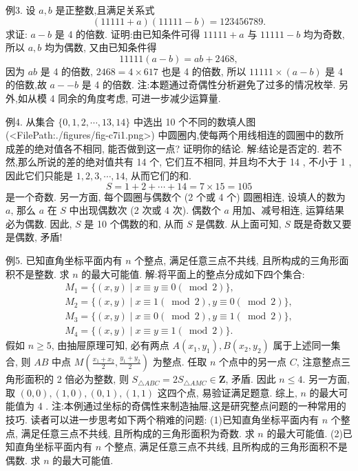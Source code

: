例3. 设 $a, b$ 是正整数,且满足关系式
$$
(11111+a)(11111-b)=123456789 .
$$
求证: $a-b$ 是 4 的倍数.
证明:由已知条件可得 $11111+a$ 与 $11111-b$ 均为奇数,所以 $a, b$ 均为偶数, 又由已知条件得
$$
11111(a-b)=a b+2468,
$$
因为 $a b$ 是 4 的倍数, $2468=4 \times 617$ 也是 4 的倍数, 所以 $11111 \times(a-b)$ 是 4 的倍数,故 $a--b$ 是 4 的倍数.
注:本题通过奇偶性分析避免了过多的情况枚举.
另外,如从模 4 同余的角度考虑, 可进一步减少运算量.



例4. 从集合 $\{0,1,2, \cdots, 13,14\}$ 中选出 10 个不同的数填人图 (<FilePath:./figures/fig-c7i1.png>) 中圆圈内,使每两个用线相连的圆圈中的数所成差的绝对值各不相同, 能否做到这一点? 证明你的结论.
解:结论是否定的.
若不然,那么所说的差的绝对值共有 14 个, 它们互不相同, 并且均不大于 14 , 不小于 1 , 因此它们只能是 $1,2,3, \cdots, 14$, 从而它们的和.
$$
S=1+2+\cdots+14=7 \times 15=105
$$
是一个奇数.
另一方面, 每个圆圈与偶数个 (2 个或 4 个) 圆圈相连, 设填人的数为 $a$, 那么 $a$ 在 $S$ 中出现偶数次 (2 次或 4 次). 偶数个 $a$ 用加、减号相连, 运算结果必为偶数.
因此, $S$ 是 10 个偶数的和, 从而 $S$ 是偶数.
从上面可知, $S$ 既是奇数又要是偶数, 矛盾!



例5. 已知直角坐标平面内有 $n$ 个整点, 满足任意三点不共线, 且所构成的三角形面积不是整数.
求 $n$ 的最大可能值.
解:将平面上的整点分成如下四个集合:
$$
\begin{gathered}
M_1=\{(x, y) \mid x \equiv y \equiv 0(\bmod 2)\}, \\
M_2=\{(x, y) \mid x \equiv 1(\bmod 2), y \equiv 0(\bmod 2)\}, \\
M_3=\{(x, y) \mid x \equiv 0(\bmod 2), y \equiv 1(\bmod 2)\}, \\
M_4=\{(x, y) \mid x \equiv y \equiv 1(\bmod 2)\} .
\end{gathered}
$$
假如 $n \geqslant 5$, 由抽屉原理可知, 必有两点 $A\left(x_1, y_1\right), B\left(x_2, y_2\right)$ 属于上述同一集合, 则 $A B$ 中点 $M\left(\frac{x_1+x_2}{2}, \frac{y_1+y_2}{2}\right)$ 为整点.
任取 $n$ 个点中的另一点 $C$, 注意整点三角形面积的 2 倍必为整数, 则 $S_{\triangle A B C}=2 S_{\triangle A M C} \in \mathbf{Z}$, 矛盾.
因此 $n \leqslant 4$.
另一方面, 取 $(0,0),(1,0),(0,1),(1,1)$ 这四个点, 易验证满足题意.
综上, $n$ 的最大可能值为 4 .
注:本例通过坐标的奇偶性来制造抽屉,这是研究整点问题的一种常用的技巧.
读者可以进一步思考如下两个稍难的问题:
(1)已知直角坐标平面内有 $n$ 个整点, 满足任意三点不共线, 且所构成的三角形面积为奇数.
求 $n$ 的最大可能值.
(2)已知直角坐标平面内有 $n$ 个整点, 满足任意三点不共线, 且所构成的三角形面积不是偶数.
求 $n$ 的最大可能值.



